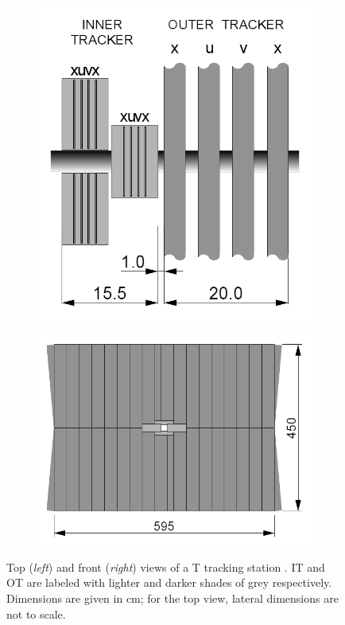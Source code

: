 \begin{figure}[t]
	\centering
	\begin{subfigure}{.45\textwidth}
		\includegraphics[width=\textwidth]{graphics/02-lhcb/t_station_top_view.png}
		\caption{}
		\label{fig:2:t_station_top}
	\end{subfigure}
	\begin{subfigure}{.45\textwidth}
		\includegraphics[width=\textwidth]{graphics/02-lhcb/t_station_front_view.png}
		\caption{}
		\label{fig:2:t_station_front}
	\end{subfigure}
	\caption[Top and front views of a T tracking station.]{Top (\textit{left}) and front (\textit{right}) views of a T tracking station \cite{Barbosa-Marinho:582793}. IT and OT are labeled with lighter and darker shades of grey respectively. Dimensions are given in \si{\centi\meter}; for the top view, lateral dimensions are not to scale.}
	\label{fig:2:t_station}
\end{figure}

